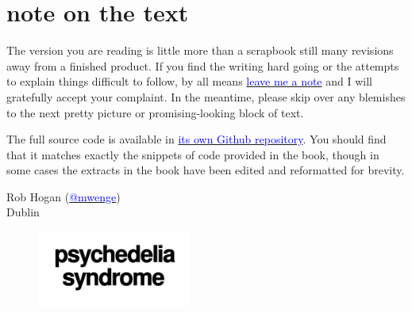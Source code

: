 \section*{note on the text}
The version you are reading is little more than a scrapbook still many revisions away from a
finished product. If you find the writing hard going or the attempts to explain things difficult
to follow, by all means \href{https://github.com/mwenge/psypixels/issues}{\textcolor{blue}{leave me a note}} and
I will gratefully accept your complaint. In the meantime, please skip over any blemishes
to the next pretty picture or promising-looking block of text.

The full source code is available in \href{https://github.com/mwenge/psychedelia}{\textcolor{blue}{its own Github repository}}. 
You should find that it matches exactly the snippets of code provided in the book, though in some cases the extracts in the book have been edited
and reformatted for brevity.


Rob Hogan (\href{https://mastodon.social/@mwenge}{\textcolor{blue}{@mwenge}})\\
Dublin \the\year{} \\

\clearpage
\clearpage
\shipout\null
\vspace*{\fill}
\begin{figure}[H]
    \centering
      \includegraphics[width=5cm]{src/cover/title_page.png}%
\end{figure}
\vspace*{\fill}
\thispagestyle{empty}%
\clearpage
\shipout\null

